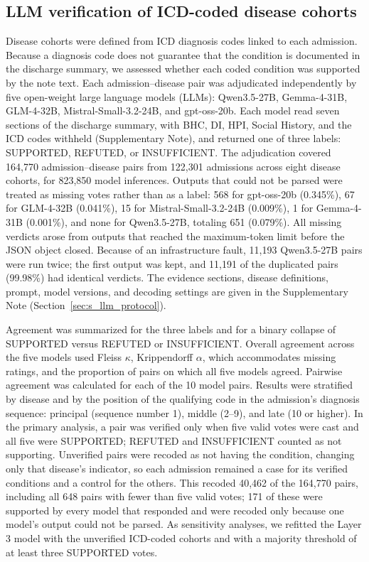 \documentclass[unnumsec,webpdf,contemporary,large]{oup-authoring-template}
\begin{document}
\subsection{LLM verification of ICD-coded disease cohorts}

Disease cohorts were defined from ICD diagnosis codes linked to each admission. Because a diagnosis code does not guarantee that the condition is documented in the discharge summary, we assessed whether each coded condition was supported by the note text. Each admission--disease pair was adjudicated independently by five open-weight large language models (LLMs): Qwen3.5-27B, Gemma-4-31B, GLM-4-32B, Mistral-Small-3.2-24B, and gpt-oss-20b. Each model read seven sections of the discharge summary, with BHC, DI, HPI, Social History, and the ICD codes withheld (Supplementary Note), and returned one of three labels: SUPPORTED, REFUTED, or INSUFFICIENT. The adjudication covered 164,770 admission--disease pairs from 122,301 admissions across eight disease cohorts, for 823,850 model inferences. Outputs that could not be parsed were treated as missing votes rather than as a label: 568 for gpt-oss-20b (0.345\%), 67 for GLM-4-32B (0.041\%), 15 for Mistral-Small-3.2-24B (0.009\%), 1 for Gemma-4-31B (0.001\%), and none for Qwen3.5-27B, totaling 651 (0.079\%). All missing verdicts arose from outputs that reached the maximum-token limit before the JSON object closed. Because of an infrastructure fault, 11,193 Qwen3.5-27B pairs were run twice; the first output was kept, and 11,191 of the duplicated pairs (99.98\%) had identical verdicts. The evidence sections, disease definitions, prompt, model versions, and decoding settings are given in the Supplementary Note (Section~\ref{sec:s_llm_protocol}).

Agreement was summarized for the three labels and for a binary collapse of SUPPORTED versus REFUTED or INSUFFICIENT. Overall agreement across the five models used Fleiss \(\kappa\), Krippendorff \(\alpha\), which accommodates missing ratings, and the proportion of pairs on which all five models agreed. Pairwise agreement was calculated for each of the 10 model pairs. Results were stratified by disease and by the position of the qualifying code in the admission's diagnosis sequence: principal (sequence number 1), middle (2--9), and late (10 or higher). In the primary analysis, a pair was verified only when five valid votes were cast and all five were SUPPORTED; REFUTED and INSUFFICIENT counted as not supporting. Unverified pairs were recoded as not having the condition, changing only that disease's indicator, so each admission remained a case for its verified conditions and a control for the others. This recoded 40,462 of the 164,770 pairs, including all 648 pairs with fewer than five valid votes; 171 of these were supported by every model that responded and were recoded only because one model's output could not be parsed. As sensitivity analyses, we refitted the Layer 3 model with the unverified ICD-coded cohorts and with a majority threshold of at least three SUPPORTED votes.
\end{document}
